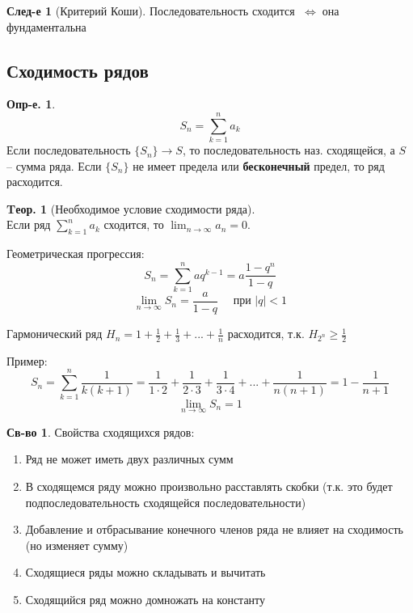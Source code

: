\documentclass[a4paper,12pt]{article}
\numberwithin{figure}{section}
\theoremstyle{definition}
\newtheorem{definition}{Опр-е.}[section]
\newtheorem*{property}{Св-во}  %
\theoremstyle{definition}
\newtheorem{theorem}{Tеор.}[section]
\newtheorem*{corollary}{След-е} %
\def\ntoinf{n \to \infty}
\def\geqs{\geqslant}
\def\iff {$\;\Longleftrightarrow\;$}
\begin{document}
\begin{corollary}[Критерий Коши]
	Последовательность сходится \iff она фундаментальна
\end{corollary}


\subsection{Сходимость рядов}

\begin{definition}
	\[ S_n = \sum_{k=1}^n a_k \]
	Если последовательность $\{S_n\} \to S$, то последовательность наз. сходящейся, а $S$ -- сумма ряда. Если $\{S_n\}$ не имеет предела или \textbf{бесконечный} предел, то ряд расходится.
\end{definition}

\begin{theorem}[Необходимое условие сходимости ряда] \ \\
	Если ряд $\displaystyle \sum_{k=1}^n a_k$ сходится,
	то $\displaystyle \lim_{\ntoinf}a_n = 0$.
\end{theorem}

Геометрическая прогрессия:
	\[ S_n = \sum_{k=1}^n aq^{k-1} = a\frac{1-q^n}{1-q} \]
	\[ \lim_{\ntoinf}S_n = \frac{a}{1-q} \quad \text{ при } |q|<1 \]

Гармонический ряд $\displaystyle H_n = 1 + \frac12 + \frac13 + ... + \frac1n$
расходится, т.к. $\displaystyle H_{2^n} \geqs \frac12$

\bigbreak
Пример:
\[ S_n = \sum_{k=1}^n \frac1{k(k+1)}
       = \frac1{1\cdot2} + \frac1{2\cdot3} + \frac1{3\cdot4} + ... + \frac1{n(n+1)}
       = 1 - \frac1{n+1} \]
\[ \lim_{\ntoinf}S_n = 1 \]

\begin{property} Свойства сходящихся рядов:
  \begin{enumerate}
	\item Ряд не может иметь двух различных сумм
	\item В сходящемся ряду можно произвольно расставлять скобки
		  (т.к. это будет подпоследовательность сходящейся последовательности)
	\item Добавление и отбрасывание конечного членов ряда не влияет на сходимость (но изменяет сумму)
	\item Сходящиеся ряды можно складывать и вычитать
	\item Сходящийся ряд можно домножать на константу
  \end{enumerate}
\end{property}
\end{document}
